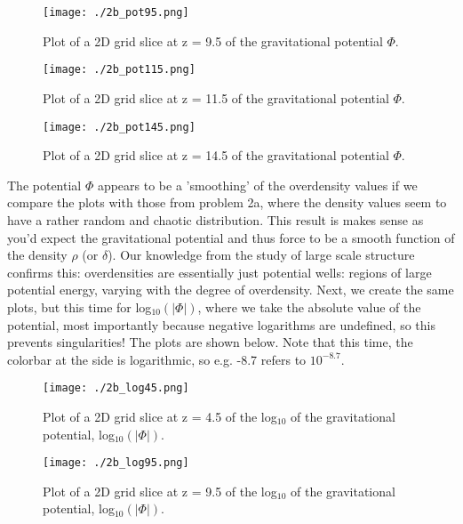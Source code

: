 \begin{figure}[h!]
  \centering
  \texttt{[image: ./2b\_pot95.png]}
  \caption{Plot of a 2D grid slice at z = 9.5 of the gravitational potential $\Phi$.}
\end{figure}

\begin{figure}[h!]
  \centering
  \texttt{[image: ./2b\_pot115.png]}
  \caption{Plot of a 2D grid slice at z = 11.5 of the gravitational potential $\Phi$.}
\end{figure}

\begin{figure}[h!]
  \centering
  \texttt{[image: ./2b\_pot145.png]}
  \caption{Plot of a 2D grid slice at z = 14.5 of the gravitational potential $\Phi$.}
\end{figure}

\clearpage

The potential $\Phi$ appears to be a 'smoothing' of the overdensity values if we compare the plots with those from problem 2a, where the density values seem to have a rather random and chaotic distribution. This result is makes sense as you'd expect the gravitational potential and thus force to be a smooth function of the density $\rho$ (or $\delta$). Our knowledge from the study of large scale structure confirms this: overdensities are essentially just potential wells: regions of large potential energy, varying with the degree of overdensity. Next, we create the same plots, but this time for log$_{10}(|\Phi|)$, where we take the absolute value of the potential, most importantly because negative logarithms are undefined, so this prevents singularities! The plots are shown below. Note that this time, the colorbar at the side is logarithmic, so e.g. -8.7 refers to $10^{-8.7}$.\\

\begin{figure}[h!]
  \centering
  \texttt{[image: ./2b\_log45.png]}
  \caption{Plot of a 2D grid slice at z = 4.5 of the log$_{10}$ of the gravitational potential, log$_{10}(|\Phi|)$.}
\end{figure}

\begin{figure}[h!]
  \centering
  \texttt{[image: ./2b\_log95.png]}
  \caption{Plot of a 2D grid slice at z = 9.5 of the log$_{10}$ of the gravitational potential, log$_{10}(|\Phi|)$.}
\end{figure}

